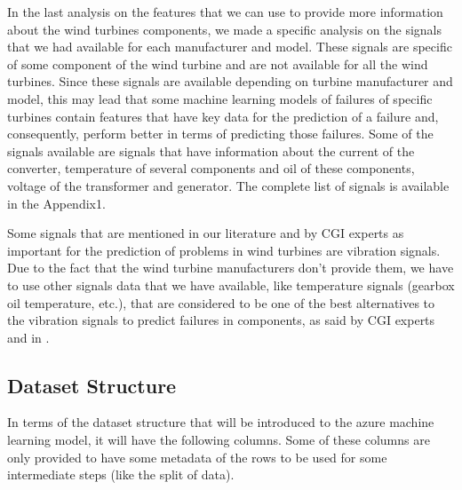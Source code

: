 In the last analysis on the features that we can use to provide more information about the wind turbines components, we made a specific analysis on the signals that we had available for each manufacturer and model. These signals are specific of some component of the wind turbine and are not available for all the wind turbines.
Since these signals are available depending on turbine manufacturer and model, this may lead that some machine learning models of failures of specific turbines contain features that have key data for the prediction of a failure and, consequently, perform better in terms of predicting those failures.
Some of the signals available are signals that have information about the current of the converter, temperature of several components and oil of these components, voltage of the transformer and generator. The complete list of signals is available in the Appendix1.


Some signals that are mentioned in our literature and by CGI experts as important for the prediction of problems in wind turbines are vibration signals. Due to the fact that the wind turbine manufacturers don't provide them, we have to use other signals data that we have available, like temperature signals (gearbox oil temperature, etc.), that are considered to be one of the best alternatives to the vibration signals to predict failures in components, as said by CGI experts and in \cite{OLD_19_WIND}.


\subsection{Dataset Structure} 
\label{sub:if_you_use_this_template} 

In terms of the dataset structure that will be introduced to the azure machine learning model, it will have the following columns. Some of these columns are only provided to have some metadata of the rows to be used for some intermediate steps (like the split of data).

